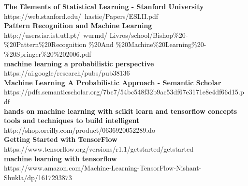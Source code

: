 \documentclass[11pt, oneside]{Thesis} %
\begin{document}
\textbf{The Elements of Statistical Learning - Stanford University}\\https://web.stanford.edu/~hastie/Papers/ESLII.pdf\\

\textbf{Pattern Recognition and Machine Learning}\\http://users.isr.ist.utl.pt/~wurmd/ Livros/school/Bishop\%20-\%20Pattern\%20Recognition \%20And \%20Machine\%20Learning\%20-\%20Springer\%20\%202006.pdf\\

\textbf{machine learning a probabilistic perspective}\\https://ai.google/research/pubs/pub38136\\

\textbf{Machine Learning A Probabilistic Approach - Semantic Scholar}\\https://pdfs.semanticscholar.org/7bc7/54bc548f32b9ac53df67e3171e8e4df66d15.pdf\\

\textbf{hands on machine learning with scikit learn and tensorflow concepts tools and techniques to build intelligent}\\http://shop.oreilly.com/product/0636920052289.do\\

\textbf{Getting Started with TensorFlow}\\https://www.tensorflow.org/versions/r1.1/getstarted/getstarted\\

\textbf{machine learning with tensorflow}\\https://www.amazon.com/Machine-Learning-TensorFlow-Nishant-Shukla/dp/1617293873\\


\appendix %






\end{document}
